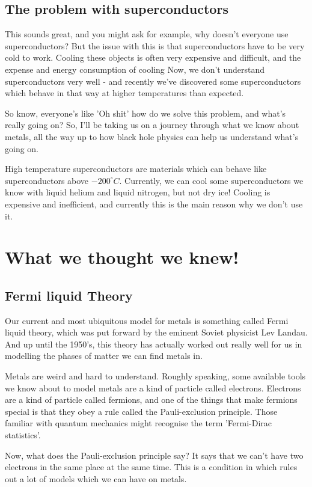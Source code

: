 \documentclass[11pt, oneside]{article}   	%
\theoremstyle{slanted}
\begin{document}
\subsection{The problem with superconductors} 
This sounds great, and you might ask for example, 
why doesn't everyone use superconductors? But the issue with this 
is that superconductors have to be very cold to work. 
Cooling these objects is often very expensive and difficult, 
and the expense and energy consumption of cooling  
Now, we don't understand superconductors very well - 
and recently we've discovered some superconductors which 
behave in that way at higher temperatures than expected.

So know, everyone's like 'Oh shit' how do we 
solve this problem, and what's really going on?
So, I'll be taking us on a journey through 
what we know about metals, all the way up to how 
black hole physics can help us understand what's going on. 

High temperature superconductors are materials 
which can behave like superconductors above $ -  200^{ \circ}C $. 
Currently, we can cool some superconductors we know with liquid helium 
and liquid nitrogen, but not dry ice! Cooling is expensive and 
inefficient, and currently this is the 
main reason why we don't use it. 

\section{What we thought we knew!}
\subsection{Fermi liquid Theory} 
Our current and most ubiquitous model for 
metals is something called Fermi liquid theory, 
which was put forward by the eminent Soviet 
physicist Lev Landau.  
And up until the 1950's, this theory 
has actually worked out really well for us 
in modelling the phases of matter we can find metals in.

Metals are weird and hard to understand. 
Roughly speaking, some available tools we know about 
to model metals are a kind of particle called electrons. 
Electrons are a kind of particle called fermions, 
and one of the things that make fermions special is that 
they obey a rule called the Pauli-exclusion principle. 
Those familiar with quantum mechanics might recognise the term 
'Fermi-Dirac statistics'.

Now, what does the Pauli-exclusion principle say? 
It says that we can't have two electrons in the 
same place at the same time. 
This is a condition in which rules out 
a lot of models which we can have on metals. 
\end{document}

